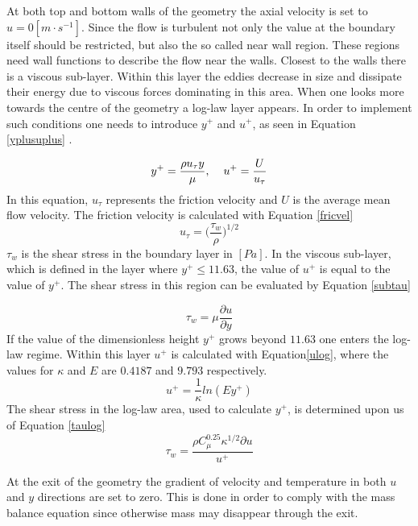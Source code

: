 \documentclass{CFD2017}
\begin{document}
At both top and bottom walls of the geometry the axial velocity is set to $u=0[m\cdot s^{-1}]$. Since the flow is turbulent not only the value at the boundary itself should be restricted, but also the so called near wall region. These regions need wall functions to describe the flow near the walls. Closest to the walls there is a viscous sub-layer. Within this layer the eddies decrease in size and dissipate their energy due to viscous forces dominating in this area. When one looks more towards the centre of the geometry a log-law layer appears. In order to implement such conditions one needs to introduce $y^+$ and $u^+$, as seen in Equation \ref{yplusuplus} \cite{Versteeg2007}.

\begin{equation}
\label{yplusuplus}
y^+=\frac{\rho u_{\tau}y}{\mu},\hspace{4mm}u^+=\frac{U}{ u_{\tau}}
\end{equation}
In this equation, $ u_{\tau}$ represents the friction velocity and $U$ is the average mean flow velocity. The friction velocity is calculated with Equation \ref{fricvel}
\begin{equation}
\label{fricvel}
u_{\tau}=\big(\frac{\tau_w}{\rho}\big)^{1/2}
\end{equation}
$\tau_w$ is the shear stress in the boundary layer in $[Pa]$. In the viscous sub-layer, which is defined in the layer where $y^+\leq 11.63$, the value of $u^+$ is equal to the value of $y^+$. The shear stress in this region can be evaluated by Equation \ref{subtau}

\begin{equation}
\label{subtau}
\tau_w = \mu \frac{\partial u}{\partial y}
\end{equation}
If the value of the dimensionless height $y^+$ grows beyond $11.63$ one enters the log-law regime. Within this layer $u^+$ is calculated with Equation\ref{ulog}, where the values for $\kappa$ and $E$ are $0.4187$ and $9.793$ respectively.
\begin{equation}
\label{ulog}
u^+=\frac{1}{\kappa}ln(Ey^+)
\end{equation}
The shear stress in the log-law area, used to calculate $y^+$, is determined upon us of Equation \ref{taulog}
\begin{equation}
\label{taulog}
\tau_w = \frac{\rho C_{\mu}^{0.25}\kappa^{1/2}\partial u}{u^+}
\end{equation}


At the exit of the geometry the gradient of velocity and temperature in both $u$ and $y$ directions are set to zero. This is done in order to comply with the mass balance equation since otherwise mass may disappear through the exit.\\
\end{document}

